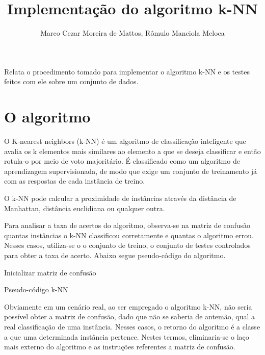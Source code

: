 \documentclass[12pt]{article}
\title{Implementação do algoritmo k-NN}
\author{Marco Cezar Moreira de Mattos\inst{1}, Rômulo Manciola Meloca\inst{1}}
\begin{document}
	\maketitle

	\begin{resumo}
		Relata o procedimento tomado para implementar o algoritmo k-NN e os testes feitos com ele sobre um conjunto de dados.
	\end{resumo}

	\section{O algoritmo}\label{sec:algoritmo}
		
		O K-nearest neighbors (k-NN) é um algoritmo de classificação inteligente que avalia os k elementos mais similares ao elemento a que se deseja classificar e então rotula-o por meio de voto majoritário. É classificado como um algoritmo de aprendizagem supervisionada, de modo que exige um conjunto de treinamento já com as respostas de cada instância de treino.

		O k-NN pode calcular a proximidade de instâncias através da distância de Manhattan, distância euclidiana ou qualquer outra.

		Para analisar a taxa de acertos do algoritmo, observa-se na matriz de confusão quantas instâncias o k-NN classificou corretamente e quantas o algoritmo errou. Nesses casos, utiliza-se o o conjunto de treino, o conjunto de testes controlados para obter a taxa de acerto. Abaixo segue pseudo-código do algoritmo.

		\begin{algorithm}[H]
			Inicializar matriz de confusão\;
			\caption{Pseudo-código k-NN}
		\end{algorithm}

		Obviamente em um cenário real, ao ser empregado o algoritmo k-NN, não seria possível obter a matriz de confusão, dado que não se saberia de antemão, qual a real classificação de uma instância. Nesses casos, o retorno do algoritmo é a classe a que uma determinada instância pertence. Nestes termos, eliminaria-se o laço mais externo do algoritmo e as instruções referentes a matriz de confusão.
\end{document}
